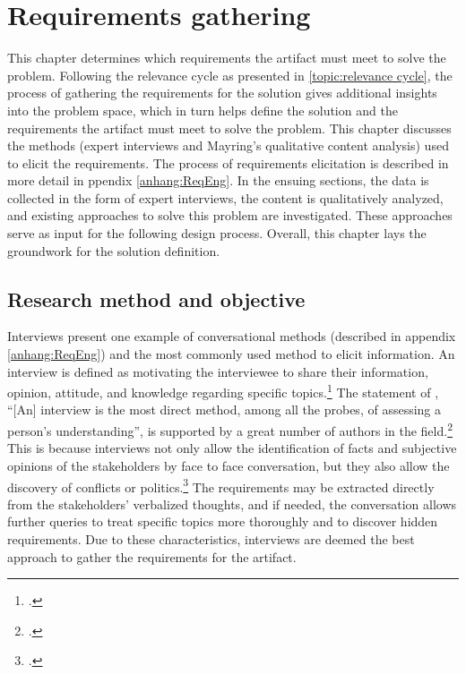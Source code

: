 \chapter{Requirements gathering} \label{chap:ReqEng}

This chapter determines which requirements the artifact must meet to solve the problem. Following the relevance cycle as presented in \ref{topic:relevance cycle}, the process of gathering the requirements for the solution gives additional insights into the problem space, which in turn helps define the solution and the requirements the artifact must meet to solve the problem. This chapter discusses the methods (expert interviews and Mayring's qualitative content analysis) used to elicit the requirements. The process of requirements elicitation is described in more detail in ppendix \ref{anhang:ReqEng}. In the ensuing sections, the data is collected in the form of expert interviews, the content is qualitatively analyzed, and existing approaches to solve this problem are investigated. These approaches serve as input for the following design process. Overall, this chapter lays the groundwork for the solution definition.

\section{Research method and objective}
Interviews present one example of conversational methods (described in appendix \ref{anhang:ReqEng}) and the most commonly used method to elicit information. An interview is defined as motivating the interviewee to share their information, opinion, attitude, and knowledge regarding specific topics.\footcite[Cf.][p.133]{KrugerqualitativeInhaltsanalyseMethode2004} The statement of \cite{WhiteProbingunderstanding1992}, \enquote{[An] interview is the most direct method, among all the probes, of assessing a person’s understanding}, is supported by a great number of authors in the field.\footcites[Cf.][p.174]{MacaulayRequirementscapturecooperative1993}[cf.][p.105]{SommervilleSoftwareengineering2011}[cf.][p.25]{ZowghiRequirementselicitationsurvey2005}[cf.][p.172]{HickeyElicitationtechniqueselection2003}[cf.][p.227]{ZhangEffectiverequirementsdevelopmentA2007}[cf.][p.92]{MasonQualitativeresearching2002} This is because interviews not only allow the identification of facts and subjective opinions of the stakeholders by face to face conversation, but they also allow the discovery of conflicts or politics.\footcites[Cf.][p.2]{TiwariMethodologySelectionRequirement2017} The requirements may be extracted directly from the stakeholders' verbalized thoughts, and if needed, the conversation allows further queries to treat specific topics more thoroughly and to discover hidden requirements. Due to these characteristics, interviews are deemed the best approach to gather the requirements for the artifact.

